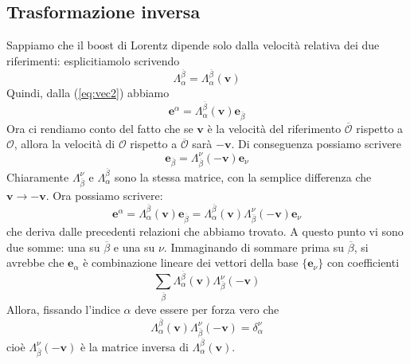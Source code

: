 \documentclass[a4paper,11pt]{book}
\theoremstyle{plain}
\theoremstyle{definition}
\begin{document}
\subsection{Trasformazione inversa}
Sappiamo che il boost di Lorentz dipende solo dalla velocità relativa dei due riferimenti: esplicitiamolo scrivendo
\[
\Lambda_{\alpha}^{\overline{\beta}}=\Lambda_{\alpha}^{\overline{\beta}}(\textbf{v})
\]
Quindi, dalla (\ref{eq:vec2}) abbiamo
\[
\textbf{e}^{\alpha} = \Lambda _{\alpha}^{\overline{\beta}}(\textbf{v})\textbf{e}_{\overline{\beta}}
\]
Ora ci rendiamo conto del fatto che se $\textbf{v}$ è la velocità del riferimento $\overline{\mathcal{O}}$ rispetto a $\mathcal{O}$, allora la velocità di $\mathcal{O}$ rispetto a $\overline{\mathcal{O}}$ sarà $-\textbf{v}$. Di conseguenza possiamo scrivere
\[
\textbf{e}_{\overline{\beta}}=\Lambda_{\overline{\beta}}^{\nu}(-\textbf{v})\textbf{e}_{\nu}
\]
Chiaramente $\Lambda_{\overline{\beta}}^{\nu}$ e $\Lambda _{\alpha}^{\overline{\beta}}$ sono la stessa matrice, con la semplice differenza che $\textbf{v} \to -\textbf{v}$. Ora possiamo scrivere:
\[
\textbf{e}^{\alpha} = \Lambda _{\alpha}^{\overline{\beta}}(\textbf{v})\textbf{e}_{\overline{\beta}} = \Lambda _{\alpha}^{\overline{\beta}}(\textbf{v})\Lambda_{\overline{\beta}}^{\nu}(-\textbf{v})\textbf{e}_{\nu}
\]
che deriva dalle precedenti relazioni che abbiamo trovato. A questo punto vi sono due somme: una su $\overline{\beta}$ e una su $\nu$. Immaginando di sommare prima su $\overline{\beta}$, si avrebbe che $\textbf{e}_{\alpha}$ è combinazione lineare dei  vettori della base $\{ \textbf{e}_{\nu}\}$ con coefficienti
\[
\sum_{\overline{\beta}}\Lambda _{\alpha}^{\overline{\beta}}(\textbf{v})\Lambda_{\overline{\beta}}^{\nu}(-\textbf{v})
\]
Allora, fissando l'indice $\alpha$ deve essere per forza vero che
\begin{equation}\label{eq:vec3}
\Lambda _{\alpha}^{\overline{\beta}}(\textbf{v})\Lambda_{\overline{\beta}}^{\nu}(-\textbf{v})=\delta_{\alpha}^{\nu}
\end{equation}
cioè $\Lambda_{\overline{\beta}}^{\nu}(-\textbf{v})$ è la matrice inversa di $\Lambda _{\alpha}^{\overline{\beta}}(\textbf{v})$. 
\end{document}
